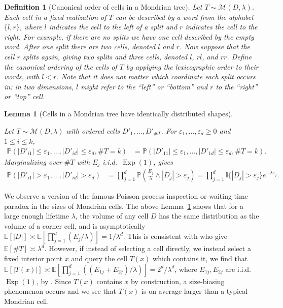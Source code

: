 \documentclass[11pt,lof]{puthesis}
\renewcommand{\P}{\ensuremath{\mathbb{P}}}
\newcommand{\E}{\ensuremath{\mathbb{E}}}
\newcommand{\I}{\ensuremath{\mathbb{I}}}
\newcommand{\cM}{\ensuremath{\mathcal{M}}}
\DeclareMathOperator{\Exp}{Exp}
\theoremstyle{break}
\newtheorem{lemma}{Lemma}[section]
\newtheorem{definition}{Definition}[section]
\theoremstyle{proof}
\begin{document}
\begin{definition}[Canonical order of cells in a Mondrian tree]
Let $T \sim \cM(D, \lambda)$.
Each cell in a fixed realization of $T$ can be described by
a word from the alphabet $\{l, r\}$,
where $l$ indicates the cell to the left of a split
and $r$ indicates the cell to the right.
For example, if there are no splits we have one cell
described by the empty word.
After one split there are two cells, denoted
$l$ and $r$.
Now suppose that the cell $r$ splits again, giving two splits and three cells,
denoted $l$, $r l$, and $r r$.
Define the canonical ordering of the cells of $T$ by applying
the lexicographic order to their words, with $l < r$.
Note that it does not matter which coordinate each split occurs in:
in two dimensions, $l$ might refer to the ``left'' or ``bottom''
and $r$ to the ``right'' or ``top'' cell.
\end{definition}

\begin{lemma}[Cells in a Mondrian tree have identically distributed shapes]
\label{lem:mondrian_app_cells_identically_distributed}

Let $T \sim \cM(D, \lambda)$
with ordered cells $D'_1, \ldots, D'_{\# T}$.
For $\varepsilon_1, \ldots, \varepsilon_d \geq 0$
and $1 \leq i \leq k$,
%
\begin{align*}
\P\left(
|D'_{i1}| \leq \varepsilon_1,
\ldots, |D'_{id}| \leq \varepsilon_d,
\# T = k
\right)
&=
\P\left(
|D'_{11}| \leq \varepsilon_1,
\ldots, |D'_{1d}| \leq \varepsilon_d,
\# T = k
\right).
\end{align*}
%
Marginalizing over $\# T$
with $E_j$ i.i.d.\ $\Exp(1)$,
\citet[Proposition~1]{mourtada2020minimax} gives
%
\begin{align*}
\P\left(
|D'_{i1}| > \varepsilon_1,
\ldots, |D'_{id}| > \varepsilon_d
\right)
&=
\prod_{j=1}^d
\P\left(
\frac{E_j}{\lambda} \wedge |D_j|
> \varepsilon_j
\right)
= \prod_{j=1}^d
\I\{|D_j| > \varepsilon_j\}
e^{-\lambda \varepsilon_j}.
\end{align*}

\end{lemma}

We observe a version of the famous Poisson process inspection or waiting time
paradox in the sizes of Mondrian cells. The above
Lemma~\ref{lem:mondrian_app_cells_identically_distributed} shows that for a
large enough
lifetime $\lambda$, the volume of any cell $D$ has the same distribution as the
volume of a corner cell, and is asymptotically
$\E[|D|] \asymp \E \left[ \prod_{j=1}^{d} (E_j / \lambda) \right]
= 1/\lambda^d$.
This is consistent with \citet[Proposition~2]{mourtada2020minimax} who give
$\E[\# T] \asymp \lambda^d$.
However, if instead of selecting a cell directly,
we instead select a fixed interior point $x$
and query the cell $T(x)$ which contains it, we find that
$\E[|T(x)|] \asymp \E \left[
\prod_{j=1}^{d} ((E_{1j} + E_{2j}) / \lambda) \right]
= 2^d/\lambda^d$, where $E_{1j}, E_{2j}$ are i.i.d.\ $\Exp(1)$,
by \citet[Proposition~1]{mourtada2020minimax}.
Since $T(x)$ contains $x$ by construction, a size-biasing phenomenon occurs
and we see that $T(x)$ is on average larger than a typical Mondrian cell.
\end{document}

